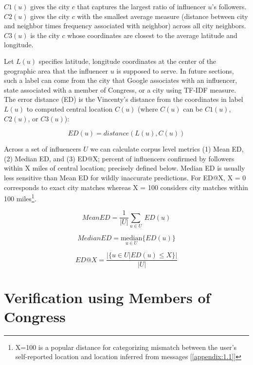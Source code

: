 $C1(u)$ gives the city $c$ that captures the largest ratio of influencer $u$'s followers. $C2(u)$ gives the city $c$ with the smallest average measure (distance between city and neighbor times frequency associated with neighbor) across all city neighbors. $C3(u)$ is the city $c$ whose coordinates are closest to the average latitude and longitude.

Let $L(u)$ specifies latitude, longitude coordinates at the center of the geographic area that the influencer $u$ is supposed to serve. In future sections, such a label can come from the city that Google associates with an influencer, state associated with a member of Congress, or a city using TF-IDF measure. The error distance (ED) is the Vincenty's distance from the coordinates in label $L(u)$ to computed central location $C(u)$ (where $C(u)$ can be $C1(u)$, $C2(u)$, or $C3(u)$):

\begin{equation}
\label{eqn_ED}
ED(u) = distance(L(u), C(u))
\end{equation}

Across a set of influencers $U$ we can calculate corpus level metrics (1) Mean ED, (2) Median ED, and (3) ED@X; percent of influencers confirmed by followers within X miles of central location; precisely defined below. Median ED is usually less sensitive than Mean ED for wildly inaccurate predictions. For ED@X, X = 0 corresponds to exact city matches whereas X = 100 considers city matches within 100 miles\footnote{X=100 is a popular distance for categorizing mismatch between the user's self-reported location and location inferred from messages [\ref{appendix:1.1}]}. 

\begin{equation}
MeanED = \frac{1}{|U|}\sum_{u \in U}\ ED(u)
\end{equation}

\begin{equation}
MedianED = \underset{u \in U}{\mathrm{median}} \{ED(u)\}
\end{equation}

\begin{equation}
ED@X = \frac{|\{u \in U|ED(u)\leq X\}|}{|U|}
\end{equation}

\section{Verification using Members of Congress}

